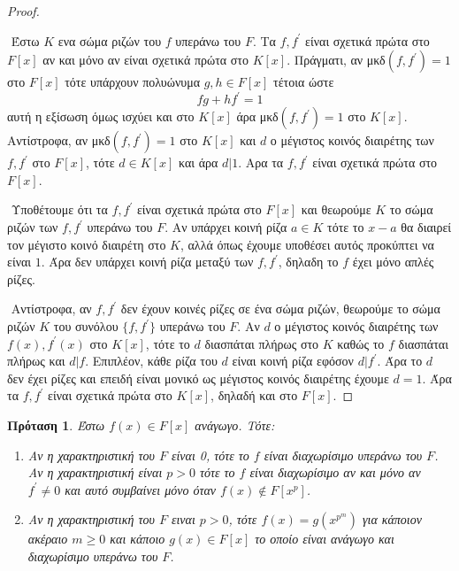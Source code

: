 \documentclass[oneside,a4paper]{article}
\newtheorem{prop}{Πρόταση}
\begin{document}
\begin{proof} $ $

	$ $\newline
	Έστω $K$ ενα σώμα ριζών του $f$ υπεράνω του $F$. Τα $f,f^{\prime}$ είναι σχετικά πρώτα στο $F[x]$ αν και μόνο αν είναι σχετικά πρώτα στο $K[x]$. Πράγματι, αν μκδ$(f,f^{\prime}) = 1$ στο $F[x]$ τότε υπάρχουν πολυώνυμα $g,h \in F[x]$ τέτοια ώστε
	$$fg+hf^{\prime} = 1$$
	αυτή η εξίσωση όμως ισχύει και στο $K[x]$ άρα μκδ$(f,f^{\prime}) = 1$ στο $K[x]$. Αντίστροφα, αν μκδ$(f,f^{\prime}) = 1$ στο $K[x]$ και $d$ ο μέγιστος κοινός διαιρέτης των $f,f^{\prime}$ στο $F[x]$, τότε $d \in K[x]$ και άρα $d|1$. Αρα τα $f,f^{\prime}$ είναι σχετικά πρώτα στο $F[x]$.
	
	$ $\newline
	Υποθέτουμε ότι τα $f,f^{\prime}$ είναι σχετικά πρώτα στο $F[x]$ και θεωρούμε $K$ το σώμα ριζών των $f,f^{\prime}$ υπεράνω του $F$. Αν υπάρχει κοινή ρίζα $a \in K$ τότε το $x-a$ θα διαιρεί τον μέγιστο κοινό διαιρέτη στο $K$, αλλά όπως έχουμε υποθέσει αυτός προκύπτει να είναι $1$. Άρα δεν υπάρχει κοινή ρίζα μεταξύ των $f,f^{\prime}$, δηλαδη το $f$ έχει μόνο απλές ρίζες.

	$ $\newline
	Αντίστροφα, αν $f,f^{\prime}$ δεν έχουν κοινές ρίζες σε ένα σώμα ριζών, θεωρούμε το σώμα ριζών $K$ του συνόλου $\{f,f^{\prime}\}$ υπεράνω του $F$. Αν $d$ ο μέγιστος κοινός διαιρέτης των $f(x), f^{\prime}(x)$ στο $K[x]$, τότε το $d$ διασπάται πλήρως στο $K$ καθώς το $f$ διασπάται πλήρως και $d|f$. Επιπλέον, κάθε ρίζα του $d$ είναι κοινή ρίζα εφόσον $d|f^{\prime}$. Άρα το $d$ δεν έχει ρίζες και επειδή είναι μονικό ως μέγιστος κοινός διαιρέτης έχουμε $d=1$. Άρα τα $f,f^{\prime}$ είναι σχετικά πρώτα στο $K[x]$, δηλαδή και στο $F[x]$.
\end{proof}
\vspace{0.1cm}
\begin{prop}Έστω $f(x) \in F[x]$ ανάγωγο. Τότε:
	\begin{enumerate} 
		\item Αν η χαρακτηριστική του $F$ είναι 0, τότε το $f$ είναι διαχωρίσιμο υπεράνω του $F$. Αν η χαρακτηριστική είναι $p > 0$ τότε το $f$ είναι διαχωρίσιμο αν και μόνο αν $f^{\prime} \neq 0$ και αυτό συμβαίνει μόνο όταν $f(x) \not\in F[x^p]$.
		\item Αν η χαρακτηριστική του $F$ ειναι $p>0$, τότε $f(x) = g(x^{p^m})$ για κάποιον ακέραιο $m\geq 0$ και κάποιο $g(x) \in F[x]$ το οποίο είναι ανάγωγο και διαχωρίσιμο υπεράνω του $F$.
	\end{enumerate}
\end{prop}
\end{document}
